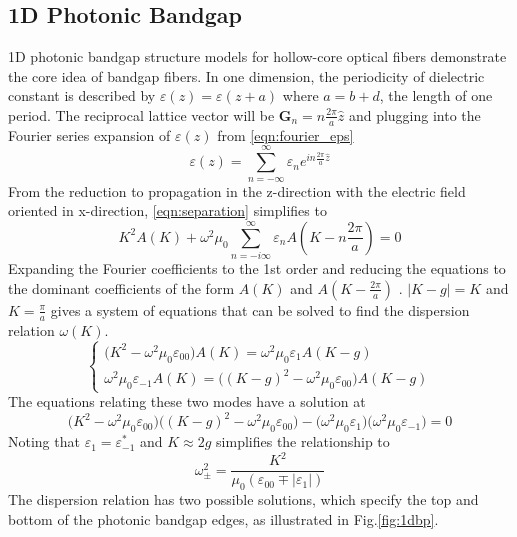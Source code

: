 \subsection{1D Photonic Bandgap}
1D photonic bandgap structure models for hollow-core optical fibers \cite{chourasia} demonstrate the core idea of bandgap fibers. In one dimension, the periodicity of dielectric constant is described by $\varepsilon(z) = \varepsilon(z+a)$ where $a = b+d$, the length of one period. The reciprocal lattice vector will be $\boldsymbol{G}_n = n\frac{2\pi}{a}\hat{z}$ and plugging into the Fourier series expansion of $\varepsilon(z)$  from \eqref{eqn:fourier_eps}
\begin{equation}
	\varepsilon(z)  =\sum_{n=-\infty}^\infty\varepsilon_ne^{in\frac{2\pi}{a}\hat{z}}
\end{equation}
From the reduction to propagation in the z-direction with the electric field oriented in x-direction, \eqref{eqn:separation} simplifies to
\begin{equation}
	K^2A(K) + \omega^2\mu_0\sum_{n=-i\infty}^\infty\varepsilon_nA(K-n\frac{2\pi}{a}) = 0
\end{equation}
Expanding the Fourier coefficients to the 1st order and reducing the equations to the dominant coefficients of the form $A(K)$ and $A(K-\frac{2\pi}{a})$ . $|K - g| = K$ and $K = \frac{\pi}{a}$ gives a system of equations that can be solved to find the dispersion relation $\omega(K)$.
\begin{equation}
	\begin{cases}
		\big(K^2-\omega^2\mu_0\varepsilon_{00}\big)A(K) = \omega^2\mu_0\varepsilon_1A(K - g) \\
		\omega^2\mu_0\varepsilon_{-1}A(K) = \big((K-g)^2-\omega^2\mu_0\varepsilon_{00}\big)A(K-g)
	\end{cases}
\end{equation}
The equations relating these two modes have a solution at
\begin{equation}
	\big(K^2-\omega^2\mu_0\varepsilon_{00}\big)\big((K-g)^2-\omega^2\mu_0\varepsilon_{00}\big) -\big(\omega^2\mu_0\varepsilon_1\big)\big(\omega^2\mu_0\varepsilon_{-1}\big)  = 0
\end{equation}
Noting that $\varepsilon_1 = \varepsilon_{-1}^*$ and $K\approx2g$ simplifies the relationship to
\begin{equation}
	\omega_{\pm}^2 = \frac{K^2}{\mu_0(\varepsilon_{00}\mp|\varepsilon_1|)}
\end{equation}
The dispersion relation has two possible solutions, which specify the top and bottom of the photonic bandgap edges, as illustrated in Fig.\ref{fig:1dbp}.
